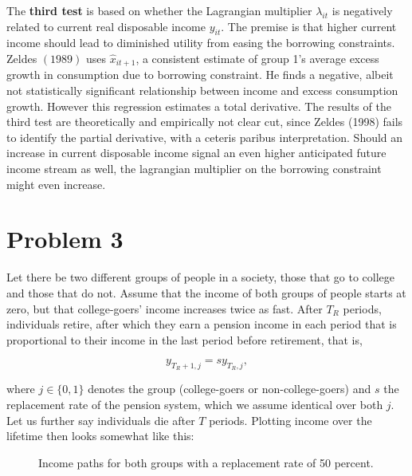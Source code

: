 \documentclass[a4paper, 12pt]{article}
\begin{document}
The \textbf{third test} is based on whether the Lagrangian multiplier $\lambda_{it}$ is negatively related to current real disposable income $y_{it}$. The premise is that higher current income should lead to diminished utility from easing the borrowing constraints. Zeldes $(1989)$ uses $\hat{x}_{it+1}$, a consistent estimate of group 1's average excess growth in consumption due to borrowing constraint. He finds a negative, albeit not statistically significant relationship between income and excess consumption growth. However this regression estimates a total derivative. The results of the third test are theoretically and empirically not clear cut, since Zeldes (1998) fails to identify the partial derivative, with a ceteris paribus interpretation. Should an increase in current disposable income signal an even higher anticipated future income stream as well, the lagrangian multiplier on the borrowing constraint might even increase.

\section*{Problem 3}

Let there be two different groups of people in a society, those that go to college and those that do not. Assume that the income of both groups of people starts at zero, but that college-goers' income increases twice as fast. After $T_R$ periods, individuals retire, after which they earn a pension income in each period that is proportional to their income in the last period before retirement, that is, 

\[
    y_{T_R+1,j} = sy_{T_R,j},
\]

where $j \in \{0,1\}$ denotes the group (college-goers or non-college-goers) and $s$ the replacement rate of the pension system, which we assume identical over both $j$. Let us further say individuals die after $T$ periods. Plotting income over the lifetime then looks somewhat like this:

\begin{figure}[H]
    \centering
    \caption{Income paths for both groups with a replacement rate of 50 percent.}
    \label{fig:graph3a_1}
\end{figure}
\end{document}
